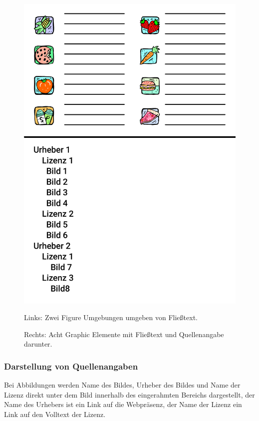 \begin{figure}
  \includegraphics[width=\columnwidth/2]{images/icon-example.pdf}

  Links: Zwei Figure Umgebungen umgeben von Fließtext.

  Rechts: Acht Graphic Elemente mit Fließtext und Quellenangabe darunter.
\end{figure}

\subsubsection{Darstellung von Quellenangaben}

Bei Abbildungen werden Name des Bildes, Urheber des Bildes und Name der Lizenz
direkt unter dem Bild innerhalb des eingerahmten Bereichs dargestellt, der Name
des Urhebers ist ein Link auf die Webpräsenz, der Name der Lizenz ein Link
auf den Volltext der Lizenz.

